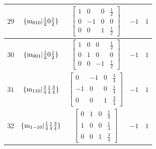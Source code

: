 \documentclass[fleqn,8pt]{jsarticle}
\begin{document}
\begin{longtable}{ccccc}
$ 29 $ & $ \{{\rm m}_{010}|\frac{1}{2} 0 \frac{1}{2}\} $ & $ \begin{bmatrix} 1 & 0 & 0 & \frac{1}{2} \\ 0 & -1 & 0 & 0 \\ 0 & 0 & 1 & \frac{1}{2} \end{bmatrix} $ & $ -1 $ & $ 1 $ \\ \hline
$ 30 $ & $ \{{\rm m}_{001}|\frac{1}{2} 0 \frac{1}{2}\} $ & $ \begin{bmatrix} 1 & 0 & 0 & \frac{1}{2} \\ 0 & 1 & 0 & 0 \\ 0 & 0 & -1 & \frac{1}{2} \end{bmatrix} $ & $ -1 $ & $ 1 $ \\ \hline
$ 31 $ & $ \{{\rm m}_{110}|\frac{3}{4} \frac{1}{4} \frac{3}{4}\} $ & $ \begin{bmatrix} 0 & -1 & 0 & \frac{3}{4} \\ -1 & 0 & 0 & \frac{1}{4} \\ 0 & 0 & 1 & \frac{3}{4} \end{bmatrix} $ & $ -1 $ & $ 1 $ \\ \hline
$ 32 $ & $ \{{\rm m}_{1-10}|\frac{1}{4} \frac{1}{4} \frac{3}{4}\} $ & $ \begin{bmatrix} 0 & 1 & 0 & \frac{1}{4} \\ 1 & 0 & 0 & \frac{1}{4} \\ 0 & 0 & 1 & \frac{3}{4} \end{bmatrix} $ & $ -1 $ & $ 1 $ \\
\end{longtable}
\end{document}

